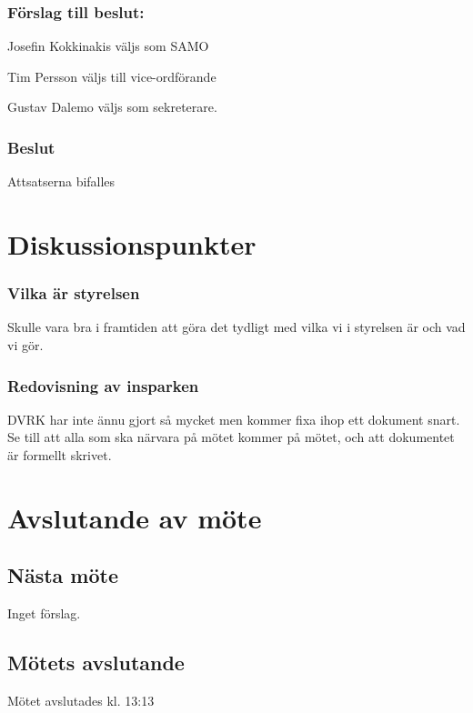 \documentclass[protokoll]{dvd}
\begin{document}
\subsubsection*{Förslag till beslut:}
\begin{attsatser}
    \item Josefin Kokkinakis väljs som SAMO
    \item Tim Persson väljs till vice-ordförande
    \item Gustav Dalemo väljs som sekreterare.
\end{attsatser}

\subsubsection*{Beslut}
\begin{attsatser}
    \item Attsatserna bifalles
\end{attsatser}


\section{Diskussionspunkter}

\subsubsection*{Vilka är styrelsen}
Skulle vara bra i framtiden att göra det tydligt med vilka vi i styrelsen är och vad vi gör.

\subsubsection*{Redovisning av insparken}
DVRK har inte ännu gjort så mycket men kommer fixa ihop ett dokument snart.
Se till att alla som ska närvara på mötet kommer på mötet, och att dokumentet är formellt skrivet.


\newpage
\section{Avslutande av möte}

\subsection{Nästa möte}
Inget förslag.

\subsection{Mötets avslutande}
Mötet avslutades kl. 13:13

\styrelsesignaturer
\end{document}
